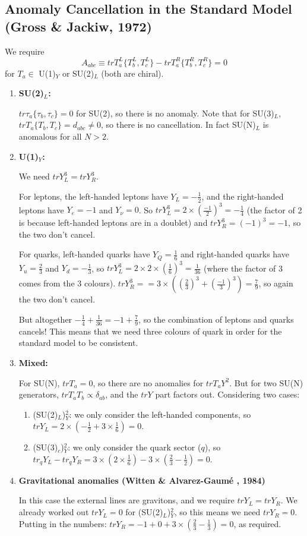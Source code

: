 \subsection{Anomaly Cancellation in the Standard Model (Gross \& Jackiw, 1972)}
%
We require
\begin{equation}
A_{abc} \equiv trT_a^L\{T_b^L,T_c^L\} - trT_a^R\{T_b^R,T_c^R\} = 0
\end{equation}
for $T_a \in$ U(1)$_Y$ or SU(2)$_L$ (both are chiral).
\begin{enumerate}
\item \textbf{SU(2)$_L$:}

$tr \tau_a \{\tau_b, \tau_c \} = 0$ for SU(2), so there is no anomaly. Note that for SU(3)$_L$, $trT_a\{T_b,T_c\}=d_{abc} \neq 0$, so there is no cancellation. In fact SU(N)$_L$ is anomalous for all $N >2$.
\item \textbf{U(1)$_Y$:} 

We need $tr Y_L^3 = tr Y_R^3$.

For leptons, the left-handed leptons have $Y_L = - \frac{1}{2}$, and the right-handed leptons have $Y_e = -1$ and $Y_\nu = 0$. So $tr Y_L^3 = 2 \times (\frac{-1}{2})^3 = -\frac{1}{4}$ (the factor of 2 is because left-handed leptons are in a doublet) and $tr Y_R^3 = (-1)^3 = -1$, so the two don't cancel.

For quarks, left-handed quarks have $Y_Q = \frac{1}{6}$ and right-handed quarks have $Y_u = \frac{2}{3}$ and $Y_d = - \frac{1}{3}$, so $tr Y_L^3 = 2\times 2 \times (\frac{1}{6})^3 = \frac{1}{36}$ (where the factor of 3 comes from the 3 colours). $tr Y_R^3 = = 3 \times ((\frac{2}{3})^3 + (\frac{-1}{3})^3) = \frac{7}{9}$, so again the two don't cancel.

But altogether $-\frac{1}{4} + \frac{1}{36} = -1 + \frac{7}{9}$, so the combination of leptons and quarks cancels! This means that we need three colours of quark in order for the standard model to be consistent. 

\item \textbf{Mixed: }

For SU(N), $tr T_a=0$, so there are no anomalies for $tr T_a Y^2$. But for two SU(N) generators, $tr T_a T_b \propto \delta_{ab}$, and the $tr Y$ part factors out. Considering two cases:
\begin{enumerate}
\item (SU(2)$_L$)$^2_Y$: we only consider the left-handed components, so $tr Y_L = 2\times (-\frac{1}{2} + 3\times \frac{1}{6}) = 0$.
\item (SU(3)$_c$)$^2_Y$: we only consider the quark sector ($q$), so $tr_q Y_L - tr_q Y_R = 3 \times (2 \times \frac{1}{6}) - 3 \times(\frac{2}{3} - \frac{1}{2}) = 0$.
\end{enumerate}

\item  \textbf{Gravitational anomalies (Witten \& Alvarez-Gaum\'e , 1984)}

In this case the external lines are gravitons, and we require $tr Y_L = tr Y_R$. We already worked out $tr Y_L = 0$ for (SU(2)$_L$)$^2_Y$, so this means we need $tr Y_R=0$. Putting in the numbers: $trY_R = -1 + 0 + 3\times(\frac{2}{3} - \frac{1}{3}) = 0$, as required.
\end{enumerate}

